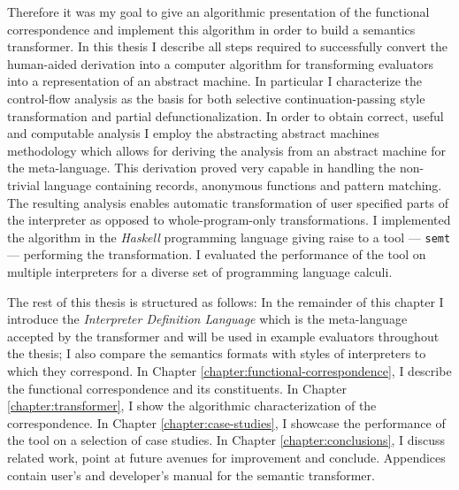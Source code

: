 Therefore it was my goal to give an algorithmic presentation of the functional correspondence and implement this algorithm in order to build a semantics transformer.
In this thesis I describe all steps required to successfully convert the human-aided derivation into a computer algorithm for transforming evaluators into a representation of an abstract machine.
In particular I characterize the control-flow analysis as the basis for both selective continuation-passing style transformation and partial defunctionalization.
In order to obtain correct, useful and computable analysis I employ the abstracting abstract machines methodology \cite{aam} which allows for deriving the analysis from an abstract machine for the meta-language.
This derivation proved very capable in handling the non-trivial language containing records, anonymous functions and pattern matching.
The resulting analysis enables automatic transformation of user specified parts of the interpreter as opposed to whole-program-only transformations.
I implemented the algorithm in the \emph{Haskell} programming language giving raise to a tool --- \texttt{semt} --- performing the transformation.
I evaluated the performance of the tool on multiple interpreters for a diverse set of programming language calculi.

The rest of this thesis is structured as follows:
In the remainder of this chapter I introduce the \textit{Interpreter Definition Language} which is the meta-language accepted by the transformer and will be used in example evaluators throughout the thesis; I also compare the semantics formats with styles of interpreters to which they correspond.
In Chapter \ref{chapter:functional-correspondence}, I describe the functional correspondence and its constituents.
In Chapter \ref{chapter:transformer}, I show the algorithmic characterization of the correspondence.
In Chapter \ref{chapter:case-studies}, I showcase the performance of the tool on a selection of case studies.
In Chapter \ref{chapter:conclusions}, I discuss related work, point at future avenues for improvement and conclude. %
Appendices contain user's and developer's manual for the semantic transformer.

